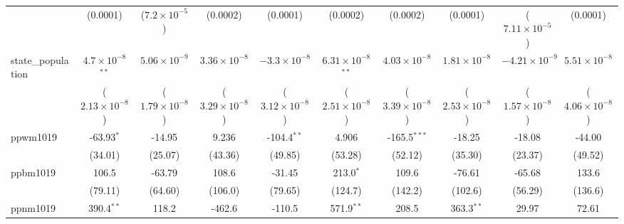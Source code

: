 \begin{table}[htbp]
\begin{tabular}{lccccccccc}
                                     & (0.0001)                     & ($7.2\times 10^{-5}$)         & (0.0002)                    & (0.0001)                  & (0.0002)                      & (0.0002)                     & (0.0001)                      & ($7.11\times 10^{-5}$)       & (0.0001)\\   
      state\_population              & $4.7\times 10^{-8}$$^{**}$   & $5.06\times 10^{-9}$          & $3.36\times 10^{-8}$        & $-3.3\times 10^{-8}$      & $6.31\times 10^{-8}$$^{**}$   & $4.03\times 10^{-8}$         & $1.81\times 10^{-8}$          & $-4.21\times 10^{-9}$        & $5.51\times 10^{-8}$\\    
                                     & ($2.13\times 10^{-8}$)       & ($1.79\times 10^{-8}$)        & ($3.29\times 10^{-8}$)      & ($3.12\times 10^{-8}$)    & ($2.51\times 10^{-8}$)        & ($3.39\times 10^{-8}$)       & ($2.53\times 10^{-8}$)        & ($1.57\times 10^{-8}$)       & ($4.06\times 10^{-8}$)\\    
      ppwm1019                       & -63.93$^{*}$                 & -14.95                        & 9.236                       & -104.4$^{**}$             & 4.906                         & -165.5$^{***}$               & -18.25                        & -18.08                       & -44.00\\   
                                     & (34.01)                      & (25.07)                       & (43.36)                     & (49.85)                   & (53.28)                       & (52.12)                      & (35.30)                       & (23.37)                      & (49.52)\\   
      ppbm1019                       & 106.5                        & -63.79                        & 108.6                       & -31.45                    & 213.0$^{*}$                   & 109.6                        & -76.61                        & -65.68                       & 133.6\\   
                                     & (79.11)                      & (64.60)                       & (106.0)                     & (79.65)                   & (124.7)                       & (142.2)                      & (102.6)                       & (56.29)                      & (136.6)\\   
      ppnm1019                       & 390.4$^{**}$                 & 118.2                         & -462.6                      & -110.5                    & 571.9$^{**}$                  & 208.5                        & 363.3$^{**}$                  & 29.97                        & 72.61\\   

\end{tabular}
\end{table}
